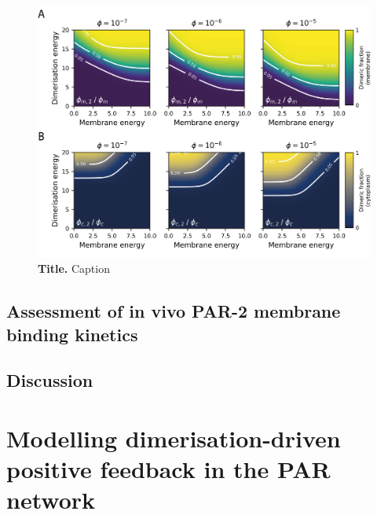 \documentclass[12pt]{"article"}
\newcommand{\mycaption}[2]{\caption[#1]{\textbf{#1.} #2}}
\begin{document}
\begin{figure}[!h]
\includegraphics[scale=0.9]{thermodynamic_model_dimer_fractions}
\setlength{\abovecaptionskip}{20pt}
\centering
\mycaption{Title}{Caption}
\label{fig:thermodynamic_model_dimer_fractions}
\end{figure}



\clearpage
\subsection{Assessment of in vivo PAR-2 membrane binding kinetics}


\subsection{Discussion}


\clearpage
\section{Modelling dimerisation-driven positive feedback in the PAR network}
\end{document}
